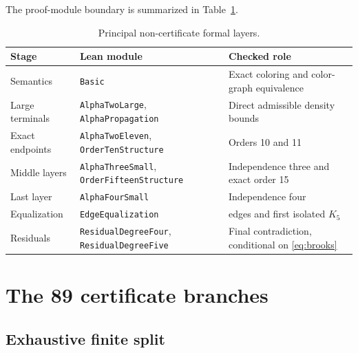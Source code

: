 \documentclass[11pt,reqno,a4paper]{amsart}
\theoremstyle{definition}
\theoremstyle{remark}
\newcommand{\code}[1]{\texttt{#1}}
\begin{document}
The proof-module boundary is summarized in
Table~\ref{tab:formal-layers}.
\begin{table}[ht]
\centering
\caption{Principal non-certificate formal layers.}
\label{tab:formal-layers}
\footnotesize
\begin{tabular}{@{}
  >{\raggedright\arraybackslash}p{}
  >{\raggedright\arraybackslash}p{}
  >{\raggedright\arraybackslash}p{}@{}}
\toprule
Stage & Lean module & Checked role\\
\midrule
Semantics & \code{Basic} & Exact coloring and color-graph equivalence\\
Large terminals & \code{AlphaTwoLarge}, \code{AlphaPropagation}
  & Direct admissible density bounds\\
Exact endpoints & \code{AlphaTwoEleven}, \code{OrderTenStructure}
  & Orders 10 and 11\\
Middle layers & \code{AlphaThreeSmall}, \code{OrderFifteenStructure}
  & Independence three and exact order 15\\
Last layer & \code{AlphaFourSmall}
  & Independence four\\
Equalization & \code{EdgeEqualization}
  & 65 edges and first isolated \(K_5\)\\
Residuals & \code{ResidualDegreeFour}, \code{ResidualDegreeFive}
  & Final contradiction, conditional on \eqref{eq:brooks}\\
\bottomrule
\end{tabular}
\end{table}

\section{The 89 certificate branches}\label{sec:certificates}

\subsection{Exhaustive finite split}
\end{document}
